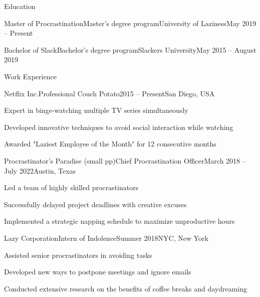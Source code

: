 \documentclass[]{kyvernitis-resume}
\begin{document}
\resumeheader
{}
{}
{}
{}
{}
{}

\begin{section}{Education}
    \begin{subsectionnobullet}{Master of Procrastination}{Master's degree program}{University of Laziness}{May 2019 -- Present}
    \end{subsectionnobullet}
    
    \begin{subsectionnobullet}{Bachelor of Slack}{Bachelor's degree program}{Slackers University}{May 2015 -- August 2019}
    \end{subsectionnobullet}
\end{section}

\begin{section}{Work Experience}
    \begin{subsection}{Netflix Inc.}{Professional Couch Potato}{2015 -- Present}{San Diego, USA}
        \item Expert in binge-watching multiple TV series simultaneously
        \item Developed innovative techniques to avoid social interaction while watching
        \item Awarded "Laziest Employee of the Month" for 12 consecutive months
    \end{subsection}
    
    \begin{subsection}{Procrastinator's Paradise (small pp)}{Chief Procrastination Officer}{March 2018 -- July 2022}{Austin, Texas}
        \item Led a team of highly skilled procrastinators
        \item Successfully delayed project deadlines with creative excuses
        \item Implemented a strategic napping schedule to maximize unproductive hours
    \end{subsection}
    
    \begin{subsection}{Lazy Corporation}{Intern of Indolence}{Summer 2018}{NYC, New York}
        \item Assisted senior procrastinators in avoiding tasks
        \item Developed new ways to postpone meetings and ignore emails
        \item Conducted extensive research on the benefits of coffee breaks and daydreaming
    \end{subsection}
    
\end{section}
\end{document}
